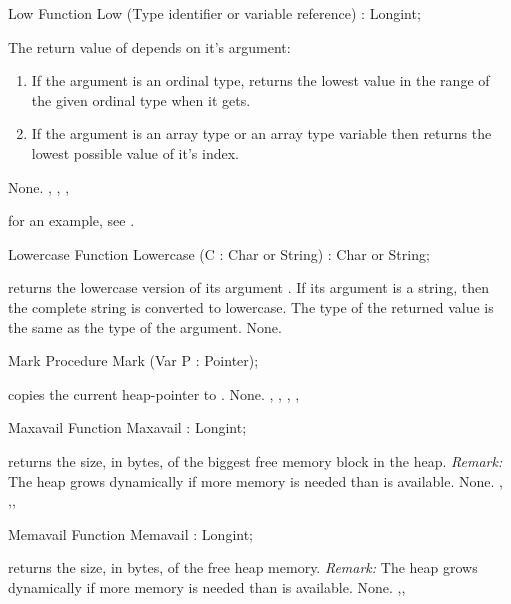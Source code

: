 \documentclass{report}
\begin{document}
\begin{function}{Low}
\Declaration
Function Low (Type identifier or variable reference) : Longint;

\Description
 The return value of  depends on it's argument:
\begin{enumerate}
\item If the argument is an ordinal type,  returns the lowest value in the range of the given ordinal
type when it gets.
\item If the argument is an array type or an array type variable then
 returns the lowest possible value of it's index.
\end{enumerate}

\Errors
None.
\SeeAlso
{}, , , 
\end{function}
for an example, see .
\begin{function}{Lowercase}
\Declaration
Function Lowercase (C : Char or String) : Char or String;

\Description
{} returns the lowercase version of its argument .
If its argument is a string, then the complete string is converted to
lowercase. The type of the returned value is the same as the type of the
argument.
\Errors
None.
\SeeAlso
{}
\end{function}
\html{}
\begin{procedure}{Mark}
\Declaration
Procedure Mark (Var P : Pointer);

\Description
{} copies the current heap-pointer to .
\Errors
None.
\SeeAlso
{}, , , , 
\end{procedure}
\html{}
\begin{function}{Maxavail}
\Declaration
Function Maxavail  : Longint;

\Description
{} returns the size, in bytes, of the biggest free memory block in
the heap.
{\em Remark:} The heap grows dynamically if more memory is needed than is
available.
\Errors
None.
\SeeAlso
{}, ,, 
\end{function}
\html{}
\begin{function}{Memavail}
\Declaration
Function Memavail  : Longint;

\Description
{} returns the size, in bytes, of the free heap memory.
{\em Remark:} The heap grows dynamically if more memory is needed than is
available.
\Errors
None.
\SeeAlso
{},, 
\end{function}
\end{document}
